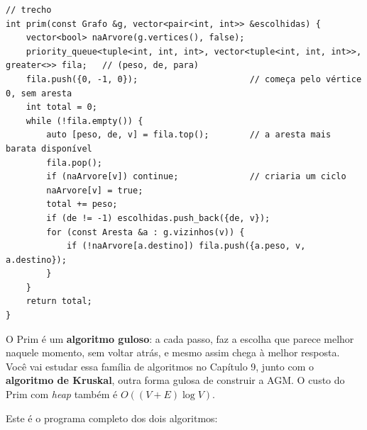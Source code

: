 \begin{codigo}
\begin{Verbatim}[breaklines=true, breaksymbolleft={}, fontsize=\footnotesize]
// trecho
int prim(const Grafo &g, vector<pair<int, int>> &escolhidas) {
    vector<bool> naArvore(g.vertices(), false);
    priority_queue<tuple<int, int, int>, vector<tuple<int, int, int>>, greater<>> fila;   // (peso, de, para)
    fila.push({0, -1, 0});                      // começa pelo vértice 0, sem aresta
    int total = 0;
    while (!fila.empty()) {
        auto [peso, de, v] = fila.top();        // a aresta mais barata disponível
        fila.pop();
        if (naArvore[v]) continue;              // criaria um ciclo
        naArvore[v] = true;
        total += peso;
        if (de != -1) escolhidas.push_back({de, v});
        for (const Aresta &a : g.vizinhos(v)) {
            if (!naArvore[a.destino]) fila.push({a.peso, v, a.destino});
        }
    }
    return total;
}
\end{Verbatim}
\end{codigo}

O Prim é um \textbf{algoritmo guloso}: a cada passo, faz a escolha que parece melhor naquele momento, sem voltar atrás, e mesmo assim chega à melhor resposta. Você vai estudar essa família de algoritmos no Capítulo 9, junto com o \textbf{algoritmo de Kruskal}, outra forma gulosa de construir a AGM. O custo do Prim com \textit{heap} também é $O((V + E) \log V)$.

Este é o programa completo dos dois algoritmos:


